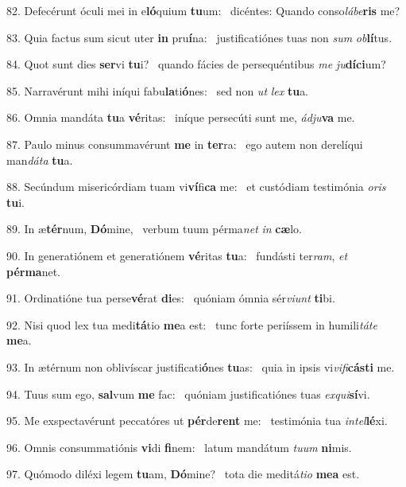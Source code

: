 82. Defecérunt óculi mei in e\textbf{ló}quium \textbf{tu}um: \ast\  dicéntes: Quando conso\textit{lá}\textit{be}\textbf{ris} me?\

83. Quia factus sum sicut uter \textbf{in} pru\textbf{í}na: \ast\  justificatiónes tuas non \textit{sum} \textit{ob}\textbf{lí}tus.\

84. Quot sunt dies \textbf{ser}vi \textbf{tu}i? \ast\  quando fácies de persequéntibus \textit{me} \textit{ju}\textbf{dí}\textbf{ci}um?\

85. Narravérunt mihi iníqui fabu\textbf{la}ti\textbf{ó}nes: \ast\  sed non \textit{ut} \textit{lex} \textbf{tu}a.\

86. Omnia mandáta \textbf{tu}a \textbf{vé}ritas: \ast\  iníque persecúti sunt me, \textit{ád}\textit{ju}\textbf{va} me.\

87. Paulo minus consummavérunt \textbf{me} in \textbf{ter}ra: \ast\  ego autem non derelíqui man\textit{dá}\textit{ta} \textbf{tu}a.\

88. Secúndum misericórdiam tuam vi\textbf{ví}fi\textbf{ca} me: \ast\  et custódiam testimónia \textit{o}\textit{ris} \textbf{tu}i.\

89. In æ\textbf{tér}num, \textbf{Dó}mine, \ast\  verbum tuum pérma\textit{net} \textit{in} \textbf{cæ}lo.\

90. In generatiónem et generatiónem \textbf{vé}ritas \textbf{tu}a: \ast\  fundásti ter\textit{ram}, \textit{et} \textbf{pér}\textbf{ma}net.\

91. Ordinatióne tua perse\textbf{vé}rat \textbf{di}es: \ast\  quóniam ómnia sér\textit{vi}\textit{unt} \textbf{ti}bi.\

92. Nisi quod lex tua medi\textbf{tá}tio \textbf{me}a est: \ast\  tunc forte periíssem in humili\textit{tá}\textit{te} \textbf{me}a.\

93. In ætérnum non oblivíscar justificati\textbf{ó}nes \textbf{tu}as: \ast\  quia in ipsis vi\textit{vi}\textit{fi}\textbf{cás}\textbf{ti} me.\

94. Tuus sum ego, \textbf{sal}vum \textbf{me} fac: \ast\  quóniam justificatiónes tuas \textit{ex}\textit{qui}\textbf{sí}vi.\

95. Me exspectavérunt peccatóres ut \textbf{pér}de\textbf{rent} me: \ast\  testimónia tua \textit{in}\textit{tel}\textbf{lé}xi.\

96. Omnis consummatiónis \textbf{vi}di \textbf{fi}nem: \ast\  latum mandátum \textit{tu}\textit{um} \textbf{ni}mis.\

97. Quómodo diléxi legem \textbf{tu}am, \textbf{Dó}mine? \ast\  tota die meditá\textit{ti}\textit{o} \textbf{me}\textbf{a} est.\

